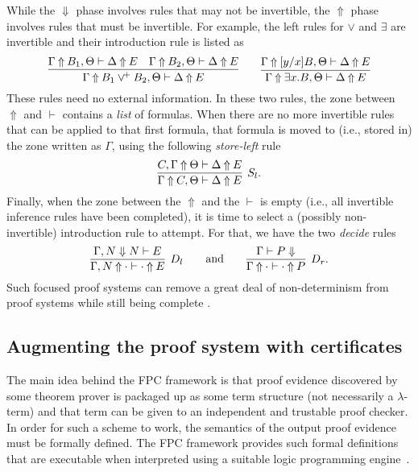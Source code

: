 \documentclass{llncs}
\begin{document}
While the $\Downarrow$ phase involves rules that may not be
invertible, the $\Uparrow$ phase involves rules that must be
invertible.  For example, the left rules for $\lor$
and $\exists$ are invertible and their introduction rule is listed as
\[
  \infer{\jUnf{\Gamma}{B_1\veep B_2,\Theta}{\Delta}{E}} %
        {\jUnf{\Gamma}{B_1,         \Theta}{\Delta}{E}\quad
         \jUnf{\Gamma}{B_2,         \Theta}{\Delta}{E}}
\qquad
  \infer{\jUnf{\Gamma}{\exists x.B, \Theta}{\Delta}{E}}
        {\jUnf{\Gamma}{[y/x]B,      \Theta}{\Delta}{E}} %
\]
These rules need no external information.  In these
two rules, the zone between $\Uparrow$ and $\vdash$ contains a
\emph{list} of formulas.  When there are no more invertible rules that
can be applied to that first formula, that formula is moved to (i.e.,
stored in) the zone written as $\Gamma$, using the following
\emph{store-left} rule 
\[
  \infer[S_l.]{\jUnf{  \Gamma}{C,\Theta}{\Delta}{E}}
              {\jUnf{C,\Gamma}{  \Theta}{\Delta}{E}}
\]
Finally, when the zone between the $\Uparrow$ and the $\vdash$ is
empty (i.e., all invertible inference rules have been completed),
it is time to select a (possibly non-invertible) introduction rule to
attempt.  For that, we have the two \emph{decide} rules
\[
  \vcenter{\infer[D_l]{\jUnf{\Gamma,N}{\cdot}{\cdot}{E}}{\jLf{\Gamma,N}{N}{E}}}
  \qquad\hbox{and}\qquad
  \vcenter{\infer[D_r.]{\jUnf{\Gamma}{\cdot}{\cdot}{P}}{\jRf{\Gamma}{P}}}
\]
Such focused proof systems can remove a great deal of non-determinism
from proof systems while still being complete \cite{liang09tcs}.


\subsection{Augmenting the proof system with certificates}

The main idea behind the FPC framework \cite{chihani13cade} is that
proof evidence discovered by some theorem prover is packaged up as
some term structure (not necessarily a $\lambda$-term) and 
that term can be given to an independent and trustable proof checker.
%
In order for such a scheme to work, the semantics of the output proof
evidence must be formally defined.
%
The FPC framework provides such formal definitions that are executable
when interpreted using a suitable logic programming
engine~\cite{miller17fac}. 
\end{document}
